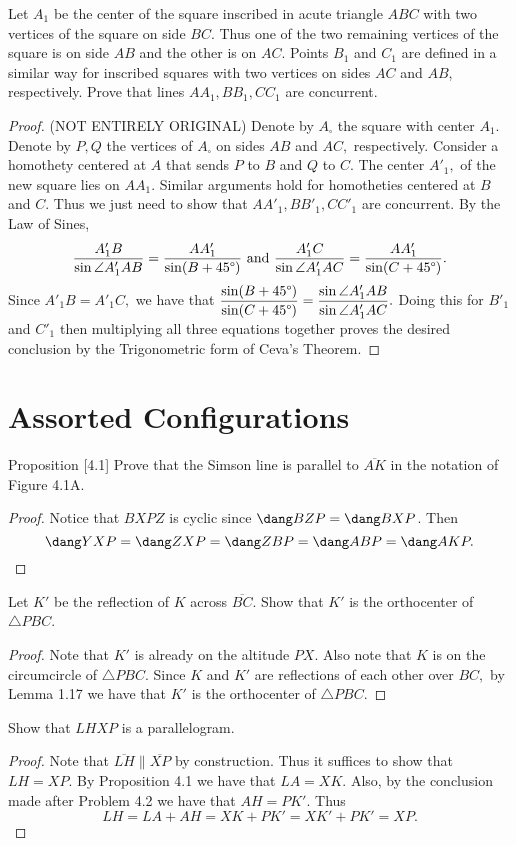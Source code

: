 \documentclass[letterpaper,oneside]{scrartcl}
\providecommand{\ol}{\overline}
\begin{document}
\begin{problem*}
  [3.28 (Shortlist 2001/G1)]
  Let $A_1$ be the center of the square inscribed in acute triangle $ABC$ with two vertices of the square on side $BC$. Thus one of the two remaining vertices of the square is on side $AB$ and the other is on $AC$. Points $B_1$ and $C_1$ are defined in a similar way for inscribed squares with two vertices on sides $AC$ and $AB$, respectively. Prove that lines $AA_1, BB_1, CC_1$ are concurrent.
\end{problem*}

\begin{proof}
  (NOT ENTIRELY ORIGINAL) Denote by $A_{\square}$ the square with center $A_1$. Denote by $P,Q$ the vertices of $A_{\square}$ on sides $AB$ and $AC,$ respectively. Consider a homothety centered at $A$ that sends $P$ to $B$ and $Q$ to $C.$ The center $A'_1,$ of the new square lies on $AA_1.$ Similar arguments hold for homotheties centered at $B$ and $C.$ Thus we just need to show that $AA'_1, BB'_1, CC'_1$ are concurrent. By the Law of Sines,
  $$\frac{A'_1B}{\sin\angle A'_1AB} = \frac{AA'_1}{\sin(B+45\degree)} \text{ and } \frac{A'_1C}{\sin\angle A'_1AC} = \frac{AA'_1}{\sin(C+45\degree)}.$$
  Since $A'_1B = A'_1C,$ we have that $\displaystyle \frac{\sin(B+45\degree)}{\sin(C+45\degree)} = \frac{\sin\angle A'_1AB}{\sin\angle A'_1AC}.$ Doing this for $B'_1$ and $C'_1$ then multiplying all three equations together proves the desired conclusion by the Trigonometric form of Ceva's Theorem.
\end{proof}
\newpage
\section{Assorted Configurations}
\begin{proposition*}
  Proposition [4.1]
  Prove that the Simson line is parallel to $\ol{AK}$ in the notation of Figure 4.1A.
\end{proposition*}
\begin{proof}
  Notice that $BXPZ$ is cyclic since $\dang BZP = \dang BXP$. Then
  $$\dang YXP = \dang ZXP = \dang ZBP  = \dang ABP = \dang AKP.$$
\end{proof}
\begin{problem*}
  [4.2]
  Let $K'$ be the reflection of $K$ across $\ol{BC}$. Show that $K'$ is the orthocenter of $\triangle PBC$.
\end{problem*}
\begin{proof}
  Note that $K'$ is already on the altitude $PX.$ Also note that $K$ is on the circumcircle of $\triangle PBC.$ Since $K$ and $K'$ are reflections of each other over $BC,$ by Lemma 1.17 we have that $K'$ is the orthocenter of $\triangle PBC.$
\end{proof}
\begin{problem*}
  [4.3]
  Show that $LHXP$ is a parallelogram.
\end{problem*}
\begin{proof}
  Note that $\ol{LH} \parallel \ol{XP}$ by construction. Thus it suffices to show that $LH = XP.$ By Proposition 4.1 we have that $LA = XK.$ Also, by the conclusion made after Problem 4.2 we have that $AH = PK'.$ Thus
  $$LH = LA + AH = XK + PK' = XK' + PK' = XP.$$
\end{proof}
\end{document}
